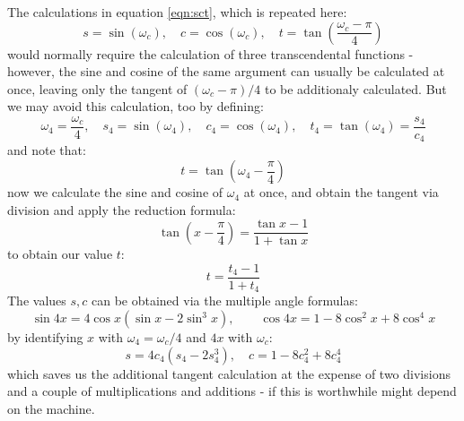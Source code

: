 The calculations in equation \ref{eqn:sct}, which is repeated here: 
\begin{equation}
 s = \sin(\omega_c), \quad c = \cos(\omega_c), \quad t = \tan \left( \frac{\omega_c-\pi}{4} \right)
\end{equation}
would normally require the calculation of three transcendental functions - however, the sine and cosine of the same argument can usually be calculated at once, leaving only the tangent of $(\omega_c-\pi)/4$ to be additionaly calculated. But we may avoid this calculation, too by defining: 
\begin{equation}
 \omega_4 = \frac{\omega_c}{4}, \quad s_4 = \sin(\omega_4), \quad c_4 = \cos(\omega_4), \quad t_4 = \tan(\omega_4) = \frac{s_4}{c_4}
\end{equation}
and note that:
\begin{equation} 
 t = \tan \left(\omega_4 - \frac{\pi}{4} \right)
\end{equation}
now we calculate the sine and cosine of $\omega_4$ at once, and obtain the tangent via division and apply the reduction formula:
\begin{equation} 
 \tan \left( x - \frac{\pi}{4} \right) = \frac{\tan x - 1}{1 + \tan x}
\end{equation}
to obtain our value $t$:
\begin{equation} 
 t = \frac{t_4 - 1}{1 + t_4}
\end{equation}
The values $s, c$ can be obtained via the multiple angle formulas:
\begin{equation} 
 \sin 4x = 4 \cos x (\sin x - 2 \sin^3 x), \qquad
 \cos 4x = 1 - 8 \cos^2 x + 8 \cos^4 x
\end{equation}
by identifying $x$ with $\omega_4 = \omega_c/4$ and $4x$ with $\omega_c$:
\begin{equation} 
 s = 4 c_4 (s_4 - 2 s_4^3 ), \quad
 c = 1 - 8 c_4^2 + 8 c_4^4
\end{equation}
which saves us the additional tangent calculation at the expense of two divisions and a couple of multiplications and additions - if this is worthwhile might depend on the machine.










%











